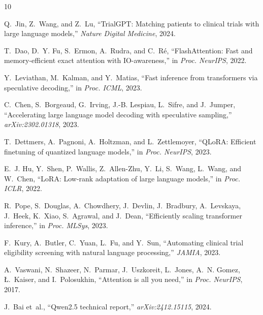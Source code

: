 \documentclass[conference]{IEEEtran}
\begin{document}
\begin{thebibliography}{10}

Q.~Jin, Z.~Wang, and Z.~Lu, ``TrialGPT: Matching patients to clinical trials with large language models,'' \textit{Nature Digital Medicine}, 2024.

T.~Dao, D.~Y. Fu, S.~Ermon, A.~Rudra, and C.~R{\'e}, ``FlashAttention: Fast and memory-efficient exact attention with IO-awareness,'' in \textit{Proc. NeurIPS}, 2022.

Y.~Leviathan, M.~Kalman, and Y.~Matias, ``Fast inference from transformers via speculative decoding,'' in \textit{Proc. ICML}, 2023.

C.~Chen, S.~Borgeaud, G.~Irving, J.-B. Lespiau, L.~Sifre, and J.~Jumper, ``Accelerating large language model decoding with speculative sampling,'' \textit{arXiv:2302.01318}, 2023.

T.~Dettmers, A.~Pagnoni, A.~Holtzman, and L.~Zettlemoyer, ``QLoRA: Efficient finetuning of quantized language models,'' in \textit{Proc. NeurIPS}, 2023.

E.~J. Hu, Y.~Shen, P.~Wallis, Z.~Allen-Zhu, Y.~Li, S.~Wang, L.~Wang, and W.~Chen, ``LoRA: Low-rank adaptation of large language models,'' in \textit{Proc. ICLR}, 2022.

R.~Pope, S.~Douglas, A.~Chowdhery, J.~Devlin, J.~Bradbury, A.~Levskaya, J.~Heek, K.~Xiao, S.~Agrawal, and J.~Dean, ``Efficiently scaling transformer inference,'' in \textit{Proc. MLSys}, 2023.

F.~Kury, A.~Butler, C.~Yuan, L.~Fu, and Y.~Sun, ``Automating clinical trial eligibility screening with natural language processing,'' \textit{JAMIA}, 2023.

A.~Vaswani, N.~Shazeer, N.~Parmar, J.~Uszkoreit, L.~Jones, A.~N. Gomez, {\L}.~Kaiser, and I.~Polosukhin, ``Attention is all you need,'' in \textit{Proc. NeurIPS}, 2017.

J.~Bai et~al., ``Qwen2.5 technical report,'' \textit{arXiv:2412.15115}, 2024.

\end{thebibliography}

\end{document}
